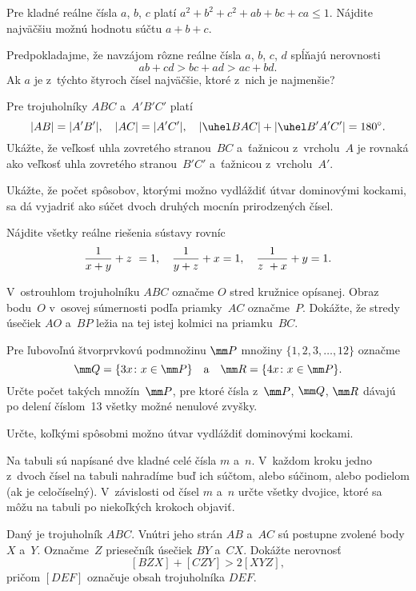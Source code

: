 {%
Pre kladné reálne čísla $a$, $b$, $c$ platí $a^2+b^2+c^2+ab+bc+ca\le1$.
Nájdite najväčšiu možnú hodnotu súčtu $a+b+c$.}

{%
Predpokladajme, že navzájom rôzne reálne čísla $a$, $b$, $c$, $d$ spĺňajú nerovnosti
$$
ab+cd > bc+ad > ac+bd.
$$
Ak $a$ je z~týchto štyroch čísel najväčšie, ktoré z~nich je najmenšie?
}

{%
Pre trojuholníky $ABC$ a~$A'B'C'$ platí
$$
|AB| = |A'B'|, \quad |AC| = |A'C'|, \quad |\uhel BAC| + |\uhel B'A'C'| = 180^\circ.
$$
Ukážte, že veľkosť uhla zovretého stranou~$BC$ a~ťažnicou
z~vrcholu~$A$ je rovnaká ako veľkosť uhla zovretého
stranou~$B'C'$ a~ťažnicou z~vrcholu~$A'$.}

{%
Ukážte, že počet spôsobov, ktorými možno vydláždiť útvar
dominovými kockami, sa dá vyjadriť ako súčet dvoch druhých mocnín
prirodzených čísel.}

{%
Nájdite všetky reálne riešenia sústavy rovníc
$$
{1\over x + y}+ z~= 1,\quad
{1\over y + z}+ x = 1,\quad
{1\over z~+ x}+ y = 1.
$$
}

{%
V~ostrouhlom trojuholníku $ABC$ označme $O$ stred kružnice
opísanej. Obraz bodu~$O$ v~osovej súmernosti podľa priamky~$AC$ označme~$P$.
Dokážte, že stredy úsečiek $AO$ a~$BP$ ležia na tej istej kolmici na priamku~$BC$.}

{%
Pre ľubovoľnú štvorprvkovú podmnožinu $\mm P$
množiny $\{1,2,3,\dots,12\}$ označme
$$
\mm Q=\{3x\colon x\in\mm P\}\quad\text{a}\quad \mm R=\{4x\colon x\in \mm P\}.
$$
Určte počet takých množín~$\mm P$, pre ktoré čísla z~$\mm P$, $\mm Q$, $\mm R$
dávajú po delení číslom~13 všetky možné nenulové zvyšky.}

{%
Určte, koľkými spôsobmi možno útvar %
vydláždiť dominovými kockami.}

{%
Na tabuli sú napísané dve kladné celé čísla $m$ a~$n$. V~každom kroku jedno z~dvoch čísel
na tabuli nahradíme buď ich súčtom, alebo súčinom, alebo podielom (ak je celočíselný).
V~závislosti od čísel $m$ a~$n$
určte všetky dvojice, ktoré sa môžu na tabuli po niekoľkých krokoch objaviť.
}

{%
Daný je trojuholník $ABC$. Vnútri jeho strán $AB$ a~$AC$
sú postupne zvolené body $X$ a~$Y$. Označme~$Z$ priesečník úsečiek $BY$ a~$CX$.
Dokážte nerovnosť $$[BZX]+[CZY]>2[XYZ],$$ pričom $[DEF]$ označuje obsah trojuholníka $DEF$.}


